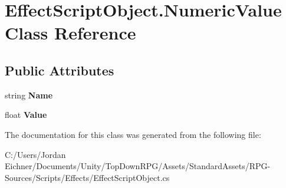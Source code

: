 \hypertarget{class_effect_script_object_1_1_numeric_value}{}\section{Effect\+Script\+Object.\+Numeric\+Value Class Reference}
\label{class_effect_script_object_1_1_numeric_value}
\subsection*{Public Attributes}
\begin{DoxyCompactItemize}
\item 
\hypertarget{class_effect_script_object_1_1_numeric_value_a999741e2fc10ebbcc4b09c0c396aebd3}{}string {\bfseries Name}\label{class_effect_script_object_1_1_numeric_value_a999741e2fc10ebbcc4b09c0c396aebd3}

\item 
\hypertarget{class_effect_script_object_1_1_numeric_value_a22b9e6b3ab3b960e7c9f2db374e77a30}{}float {\bfseries Value}\label{class_effect_script_object_1_1_numeric_value_a22b9e6b3ab3b960e7c9f2db374e77a30}

\end{DoxyCompactItemize}


The documentation for this class was generated from the following file\+:\begin{DoxyCompactItemize}
\item 
C\+:/\+Users/\+Jordan Eichner/\+Documents/\+Unity/\+Top\+Down\+R\+P\+G/\+Assets/\+Standard\+Assets/\+R\+P\+G-\/\+Sources/\+Scripts/\+Effects/Effect\+Script\+Object.\+cs\end{DoxyCompactItemize}
